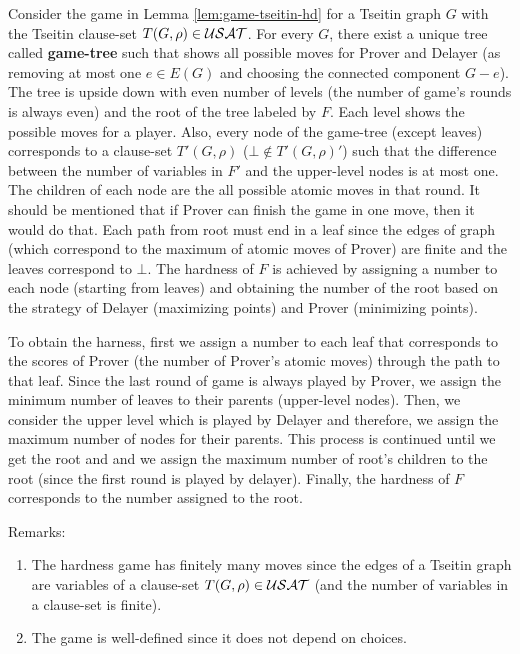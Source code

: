 \documentclass{report}
\begin{document}
\begin{lem}\label{lem:game-tree}
Consider the game in Lemma \ref{lem:game-tseitin-hd} for a Tseitin graph $G$ with the Tseitin clause-set $T(G,\rho) \in \mathcal{USAT}$. For every $G$, there exist a unique tree called \textbf{game-tree} such that shows all possible moves for Prover and Delayer (as removing at most one $e \in E(G)$ and choosing the connected component $G-e$). The tree is upside down with even number of levels (the number of game's rounds is always even) and the root of the tree labeled by $F$. Each level shows the possible moves for a player. Also, every node of the game-tree (except leaves) corresponds to a clause-set $T'(G,\rho)$ ($ \bot \not \in T'(G,\rho)'$) such that the difference between the number of variables in $F'$ and the upper-level nodes is at most one. The children of each node are the all possible atomic moves in that round. It should be mentioned that if Prover can finish the game in one move, then it would do that. Each path from root must end in a leaf since the edges of graph (which correspond to the maximum of atomic moves of Prover) are finite and the leaves correspond to $\bot$. The hardness of $F$ is achieved by assigning a number to each node (starting from leaves) and obtaining the number of the root based on the strategy of Delayer (maximizing points) and Prover (minimizing points).
\end{lem}
\begin{prf}
To obtain the harness, first we assign a number to each leaf that corresponds to the scores of Prover (the number of Prover's atomic moves) through the path to that leaf. Since the last round of game is always played by Prover, we assign the minimum number of leaves to their parents (upper-level nodes). Then, we consider the upper level which is played by Delayer and therefore, we assign the maximum number of nodes for their parents. This process is continued until we get the root and and we assign the maximum number of root's children to the root (since the first round is played by delayer). Finally, the hardness of $F$ corresponds to the number assigned to the root.
\end{prf}
Remarks:
  \begin{enumerate}
  \item The hardness game has finitely many moves since the edges of a Tseitin graph are variables of a clause-set $T(G,\rho) \in \mathcal{USAT}$ (and the number of variables in a clause-set is finite). 
  \item The game is well-defined since it does not depend on choices.
  \end{enumerate}
  
\end{document}
